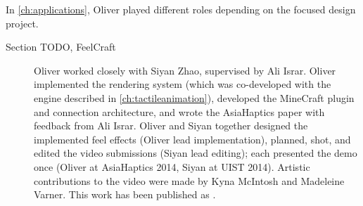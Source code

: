 In \autoref{ch:applications}, Oliver played different roles depending on the focused design project.
\begin{description}
\item[Section TODO, FeelCraft] Oliver worked closely with Siyan Zhao, supervised by Ali Israr.
Oliver implemented the rendering system (which was co-developed with the engine described in \autoref{ch:tactileanimation}), developed the MineCraft plugin and connection architecture, and wrote the AsiaHaptics paper with feedback from Ali Israr.
Oliver and Siyan together designed the implemented feel effects (Oliver lead implementation), planned, shot, and edited the video submissions (Siyan lead editing); each presented the demo once (Oliver at AsiaHaptics 2014, Siyan at UIST 2014).
Artistic contributions to the video were made by Kyna McIntosh and Madeleine Varner.
This work has been published as .

\end{description}







